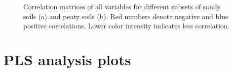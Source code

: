 \documentclass[10pt,twoside,dutch,english]{report}
\begin{document}
\begin{appendices}
\begin{figure}[h]
	\caption{Correlation matrices of all variables for different subsets of sandy soils (a) and peaty soils (b). Red numbers denote negative and blue positive correlations. Lower color intensity indicates less correlation. }
	\label{fig:results_corr_min}
\end{figure}

\section{PLS analysis plots}
\label{chap:PLS}


\linespread{0.2}
 

\end{appendices}
\end{document}
